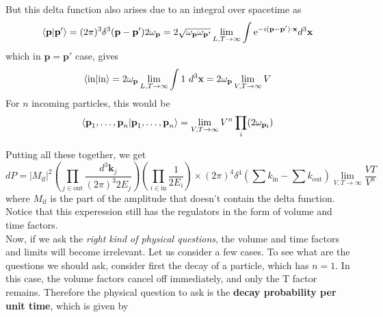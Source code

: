 \documentclass[11pt]{article}
\newcommand{\e}{\mathrm{e}}
\newcommand{\w}{\omega}
\numberwithin{equation}{section}
\begin{document}
    But this delta function also arises due to an integral over spacetime as 
    \begin{equation*}
        \braket{\textbf{p}|\textbf{p}'} = (2\pi)^3 \delta^3(\textbf{p} - \textbf{p}')2\w_\textbf{p} = 2\sqrt{\w_\textbf{p}\w_\textbf{p'}}\lim_{L,T\to\infty} \int \e^{-i(\textbf{p}-\textbf{p}')\cdot \textbf{x}} d^3\textbf{x}
    \end{equation*}
    which in \(\textbf{p}=\textbf{p}'\) case, gives 
    \begin{equation*}
        \braket{\text{in}|\text{in}} = 2\w_\textbf{p}\lim_{L,T\to\infty} \int 1~d^3\textbf{x} = 2\w_\textbf{p}\lim_{V,T\to\infty} V
    \end{equation*}
    For \(n\) incoming particles, this would be 
    \begin{equation*}
        \braket{\textbf{p}_1,\ldots,\textbf{p}_n|\textbf{p}_1,\ldots,\textbf{p}_n} = \lim_{V,T\to\infty} V^n \prod_{i} (2\w_\mathbf{p_i})
    \end{equation*}

    Putting all these together, we get 
    \begin{equation*}
        dP = |M_{\text{if}}|^2 \left(\prod_{j\in\text{out}}\frac{d^3\textbf{k}_j}{(2\pi)^3 2E_j}\right) \left(\prod_{i\in \text{in}} \frac{1}{2E_i}   \right)\times (2\pi)^4\delta^4\left(\sum k_{\text{in}} - \sum k_{\text{out}} \right)\lim_{V,T\to \infty}\frac{VT}{V^n}
    \end{equation*}
    where \(M_{\text{if}}\) is the part of the amplitude that doesn't contain the delta function. Notice that this experession still has the regulators in the form of volume and time factors.\\

    Now, if we ask the \textit{right kind of physical questions}, the volume and time factors and limits will become irrelevant. Let us consider a few cases. To see what are the questions we should ask, consider first the decay of a particle, which has \(n=1\). In this case, the volume factors cancel off immediately, and only the T factor remains. Therefore the physical question to ask is the \textbf{decay probability per unit time}, which is given by 
\end{document}
